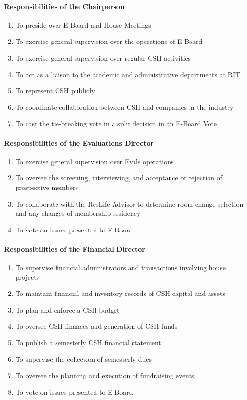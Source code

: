 \documentclass{article}
\newcommand{\asubsubsection}[1]{\paragraph{#1} \label{#1}}
\begin{document}
\asubsubsection{Responsibilities of the Chairperson}
\begin{enumerate}
	\item To preside over E-Board and House Meetings
	\item To exercise general supervision over the operations of E-Board
	\item To exercise general supervision over regular CSH activities
	\item To act as a liaison to the academic and administrative departments at RIT
	\item To represent CSH publicly
	\item To coordinate collaboration between CSH and companies in the industry
	\item To cast the tie-breaking vote in a split decision in an E-Board Vote
\end{enumerate}

\asubsubsection{Responsibilities of the Evaluations Director}
\begin{enumerate}
	\item To exercise general supervision over Evals operations
	\item To oversee the screening, interviewing, and acceptance or rejection of prospective members
	\item To collaborate with the ResLife Advisor to determine room change selection and any changes of membership residency
	\item To vote on issues presented to E-Board
\end{enumerate}

\asubsubsection{Responsibilities of the Financial Director}
\begin{enumerate}
	\item To supervise financial administrators and transactions involving house projects
	\item To maintain financial and inventory records of CSH capital and assets
	\item To plan and enforce a CSH budget
	\item To oversee CSH finances and generation of CSH funds
	\item To publish a semesterly CSH financial statement
	\item To supervise the collection of semesterly dues
	\item To oversee the planning and execution of fundraising events
	\item To vote on issues presented to E-Board
\end{enumerate}
\end{document}
